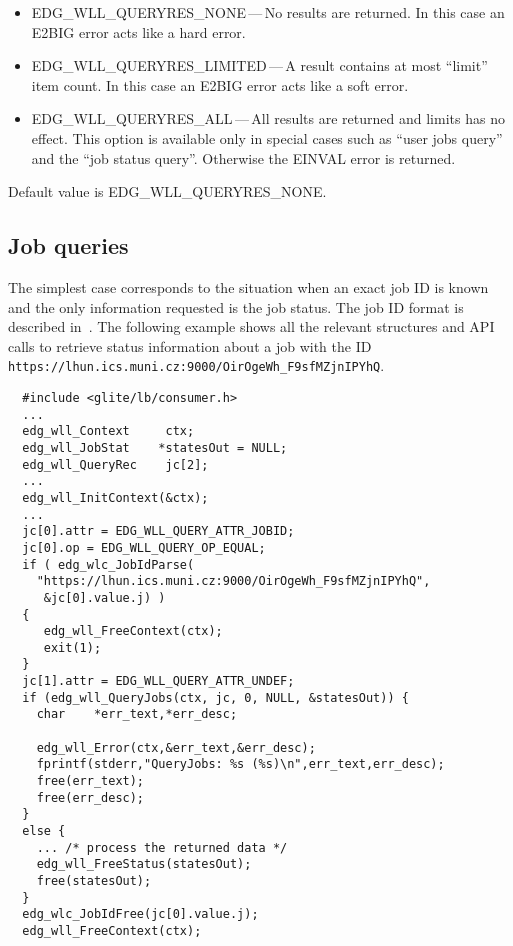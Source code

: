 \begin{itemize}
	\item{EDG\_WLL\_QUERYRES\_NONE}\,---\,No results are returned.
	In this case an E2BIG error acts like a hard error.
	\item{EDG\_WLL\_QUERYRES\_LIMITED}\,---\,A result contains at most ``limit'' item count.
	In this case an E2BIG error acts like a soft error.
	\item{EDG\_WLL\_QUERYRES\_ALL}\,---\,All results are returned and limits has no effect.
	This option is available only in special cases such as ``user jobs query'' and 
	the ``job status query''. Otherwise the EINVAL error is returned.
\end{itemize}
Default value is EDG\_WLL\_QUERYRES\_NONE.


\subsection{Job queries}

\label{JS}

The simplest case corresponds to the situation when an exact job ID
is known and the only information requested is the job status. The job ID
format is described in~\cite{djra1.4}.
The following example shows 
all the relevant structures and API calls to retrieve status information
about a job with the ID\\
\texttt{https://lhun.ics.muni.cz:9000/OirOgeWh\_F9sfMZjnIPYhQ}.

\begin{verbatim}
  #include <glite/lb/consumer.h>
  ...
  edg_wll_Context     ctx;    
  edg_wll_JobStat    *statesOut = NULL;
  edg_wll_QueryRec    jc[2];
  ...
  edg_wll_InitContext(&ctx);
  ...
  jc[0].attr = EDG_WLL_QUERY_ATTR_JOBID;
  jc[0].op = EDG_WLL_QUERY_OP_EQUAL;
  if ( edg_wlc_JobIdParse(
    "https://lhun.ics.muni.cz:9000/OirOgeWh_F9sfMZjnIPYhQ",
     &jc[0].value.j) )
  {
     edg_wll_FreeContext(ctx);
     exit(1);
  }
  jc[1].attr = EDG_WLL_QUERY_ATTR_UNDEF;
  if (edg_wll_QueryJobs(ctx, jc, 0, NULL, &statesOut)) {
    char    *err_text,*err_desc;

    edg_wll_Error(ctx,&err_text,&err_desc);
    fprintf(stderr,"QueryJobs: %s (%s)\n",err_text,err_desc);
    free(err_text);
    free(err_desc);
  }
  else {
    ...	/* process the returned data */
    edg_wll_FreeStatus(statesOut);
    free(statesOut);
  }
  edg_wlc_JobIdFree(jc[0].value.j);
  edg_wll_FreeContext(ctx);
\end{verbatim}

